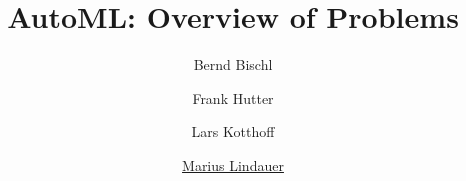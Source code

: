 




\title[AutoML: Problem]{AutoML: Overview of Problems}
\author[Marius Lindauer]{Bernd Bischl \and Frank Hutter \and Lars Kotthoff \and \underline{Marius Lindauer}}
\institute{}
\date{}





	
	\maketitle
	


